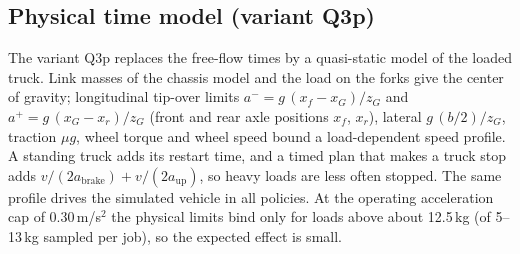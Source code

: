 \documentclass[conference]{IEEEtran}
\newcommand{\Qthreep}{Q3p}
\begin{document}
\subsection{Physical time model (variant \Qthreep)}
The variant \Qthreep{} replaces the free-flow times by a quasi-static model of
the loaded truck. Link masses of the chassis model and the load on the forks
give the center of gravity; longitudinal tip-over limits
$a^{-}=g\,(x_f-x_G)/z_G$ and $a^{+}=g\,(x_G-x_r)/z_G$ (front and rear axle
positions $x_f$, $x_r$), lateral $g\,(b/2)/z_G$, traction $\mu g$, wheel torque
and wheel speed bound a load-dependent speed profile. A standing truck adds
its restart time, and a timed plan that makes a truck stop adds
$v/(2a_{\mathrm{brake}})+v/(2a_{\mathrm{up}})$, so heavy loads are less often
stopped. The same profile drives the simulated vehicle in all policies. At
the operating acceleration cap of 0.30\,m/s$^2$ the physical limits bind only
for loads above about 12.5\,kg (of 5--13\,kg sampled per job), so the
expected effect is small.
\end{document}
